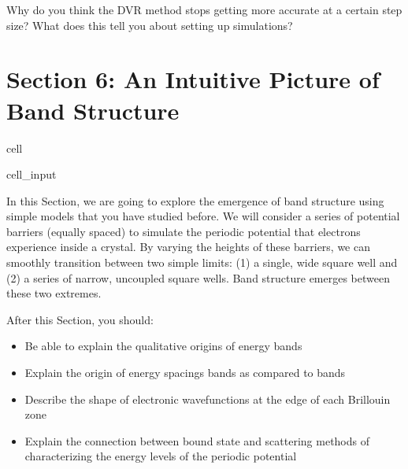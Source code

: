 \documentclass[letterpaper,10pt,english]{jupyterBook}
\begin{document}
\sphinxAtStartPar
{} Why do you think the DVR method stops getting more accurate at a certain step size? What does this tell you about setting up simulations?


\chapter{Section 6: An Intuitive Picture of Band Structure}
\label{\detokenize{Section6_v2:section-6-an-intuitive-picture-of-band-structure}}\label{\detokenize{Section6_v2::doc}}
\begin{sphinxuseclass}{cell}\begin{sphinxVerbatimInput}

\begin{sphinxuseclass}{cell_input}
\begin{sphinxVerbatim}[commandchars=\\\{\}]
   
   
    
   
\end{sphinxVerbatim}

\end{sphinxuseclass}\end{sphinxVerbatimInput}

\end{sphinxuseclass}
\sphinxAtStartPar
In this Section, we are going to explore the emergence of band structure using simple models that you have studied before. We will consider a series of potential barriers (equally spaced) to simulate the periodic potential that electrons experience inside a crystal. By varying the heights of these barriers, we can smoothly transition between two simple limits: (1) a single, wide square well and (2) a series of narrow, uncoupled square wells. Band structure emerges between these two extremes.

\sphinxAtStartPar
{}
After this Section, you should:
\begin{itemize}
\item {} 
\sphinxAtStartPar
Be able to explain the qualitative origins of energy bands

\item {} 
\sphinxAtStartPar
Explain the origin of energy spacings  bands as compared to  bands

\item {} 
\sphinxAtStartPar
Describe the shape of electronic wavefunctions at the edge of each Brillouin zone

\item {} 
\sphinxAtStartPar
Explain the connection between bound state and scattering methods of characterizing the energy levels of the periodic potential

\end{itemize}
\end{document}
